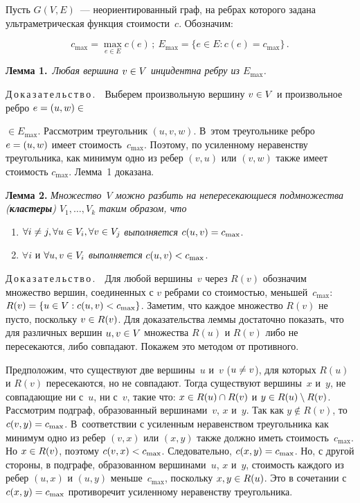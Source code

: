 \begin{multicols}{2}
Пусть $G(V,E)$~--- неориентированный граф, на ребрах которого задана
ультраметрическая функция стоимости~$c$.
Обозначим:

\noindent
$$
c_{\max} = \max \limits_{e \in E} c(e)\,;
\
E_{\max}= \{ e \in E : c(e) = c_{\max} \}\,.
$$

\smallskip

\noindent
\textbf{Лемма 1.}\
\textit{Любая вершина $v \hm\in V$ инцидентна ребру из $E_{\max}$.
}

\smallskip

\noindent
Д\,о\,к\,а\,з\,а\,т\,е\,л\,ь\,с\,т\,в\,о\,.\ \
Выберем произвольную вершину $v \hm\in V$ и произвольное ребро
$e\hm=(u,w)\in$\linebreak\vspace*{-12pt}

\pagebreak

\noindent
$\in  E_{\max}$.
Рассмотрим треугольник $(u, v, w)$. В~этом треугольнике ребро $e\hm=(u,w)$
имеет стоимость~$c_{\max}$.
Поэтому, по усиленному неравенству треугольника, как минимум одно из
ребер $(v,u)$ или $(v,w)$
также имеет стоимость $c_{\max}$. Лемма~1 доказана.

\smallskip

\noindent
\textbf{Лемма 2. }
\textit{Множество~$V$ можно разбить на непересекающиеся подмножества
(\textbf{кластеры}) $V_1,\ldots , V_k$ таким образом, что}
\begin{enumerate}
\item
$\forall i \neq j, \forall u \hm\in V_i, \forall v\hm \in V_j$
\textit{выполняется} $c(u,v)\hm=c_{\max}$.
\item
$\forall i$ и $ \forall u,v \hm\in V_i$ \textit{выполняется} $c(u,v)\hm < c_{\max}$.
\end{enumerate}

\smallskip

\noindent
Д\,о\,к\,а\,з\,а\,т\,е\,л\,ь\,с\,т\,в\,о\,.\ \
Для любой вершины~$v$ через $R(v)$ обозначим множество вершин, соединенных с
$v$ ребрами со стоимостью, меньшей~$c_{\max}$:
$R(v) \hm= \{u \in V : c(u,v) < c_{\max}\}$.
Заметим, что каждое множество $R(v)$ не пусто,
поскольку $v \hm\in R(v)$.
Для доказательства леммы достаточно показать, что для различных вершин
$u,v \hm\in V$ множества $R(u)$ и $R(v)$ либо не пересекаются, либо совпадают.
Покажем это методом от противного.

Предположим, что существуют две вершины~$u$ и~$v$ ($u \hm\neq v$), для
которых $R(u)$ и $R(v)$ пересекаются, но не совпадают. Тогда
существуют вершины~$x$ и~$y$, не совпадающие ни с~$u$, ни с~$v$,
такие что: $x \hm\in R(u) \cap R(v)$ и $y \hm\in R(u) \setminus R(v)$.
Рассмотрим подграф, образованный вершинами~$v$, $x$ и~$y$. Так как $y
\not\in R(v)$, то $c(v,y)\hm=c_{\max}$. В~соответствии с усиленным
неравенством треугольника как минимум одно из ребер $(v,x)$ или
$(x,y)$ также должно иметь стоимость~$c_{\max}$. Но $x \hm\in R(v)$,
поэтому $c(v,x) \hm< c_{\max}$. Следовательно, $c(x,y) \hm= c_{\max}$. Но,
с другой стороны, в подграфе, образованном вершинами~$u$, $x$ и~$y$,
стоимость каждого из ребер $(u,x)$ и $(u,y)$ меньше~$c_{\max}$,
поскольку $x,y \hm\in R(u)$. Это в сочетании с $c(x,y) \hm= c_{\max}$
противоречит усиленному неравенству треугольника.


\end{multicols}
